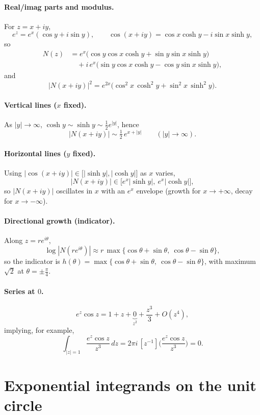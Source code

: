 \documentclass[11pt]{article}
\begin{document}
	\paragraph{Real/imag parts and modulus.}
	For \(z=x+iy\),
	\[
	e^{z}=e^{x}(\cos y+i\sin y),\qquad
	\cos(x+iy)=\cos x\cosh y-i\sin x\sinh y,
	\]
	so
	\[
	\begin{aligned}
		N(z)&=e^{x}\Big(\cos y\cos x\cosh y+\sin y\sin x\sinh y\Big)\\
		&\quad+i\,e^{x}\Big(\sin y\cos x\cosh y-\cos y\sin x\sinh y\Big),
	\end{aligned}
	\]
	and
	\[
	|N(x+iy)|^{2}=e^{2x}\Big(\cos^{2}x\,\cosh^{2}y+\sin^{2}x\,\sinh^{2}y\Big).
	\]
	
	\paragraph{Vertical lines (\(x\) fixed).}
	As \(|y|\to\infty\), \(\cosh y\sim\sinh y\sim \tfrac12 e^{|y|}\), hence
	\[
	|N(x+iy)|\sim \tfrac12\,e^{x+|y|}\qquad(|y|\to\infty).
	\]
	
	\paragraph{Horizontal lines (\(y\) fixed).}
	Using \(|\cos(x+iy)|\in\big[|\sinh y|,|\cosh y|\big]\) as \(x\) varies,
	\[
	|N(x+iy)|\in\big[e^{x}|\sinh y|,\ e^{x}|\cosh y|\big],
	\]
	so \( |N(x+iy)| \) oscillates in \(x\) with an \(e^{x}\) envelope (growth for \(x\to+\infty\), decay for \(x\to-\infty\)).
	
	\paragraph{Directional growth (indicator).}
	Along \(z=re^{i\theta}\),
	\[
	\log |N(re^{i\theta})|\approx r\,\max\{\cos\theta+\sin\theta,\ \cos\theta-\sin\theta\},
	\]
	so the indicator is \(h(\theta)=\max\{\cos\theta+\sin\theta,\ \cos\theta-\sin\theta\}\), with maximum \(\sqrt2\) at \(\theta=\pm\frac{\pi}{4}\).
	
	\paragraph{Series at \(0\).}
	\[
	e^{z}\cos z=1+z+\underbrace{0}_{z^{2}}+\frac{z^{3}}{3}+O(z^{4}),
	\]
	implying, for example,
	\[
	\int_{|z|=1}\frac{e^{z}\cos z}{z^{3}}\,dz=2\pi i\,[z^{-1}]\Big(\frac{e^{z}\cos z}{z^{3}}\Big)=0.
	\]
	
	
	\section*{Exponential integrands on the unit circle}
	
\end{document}
